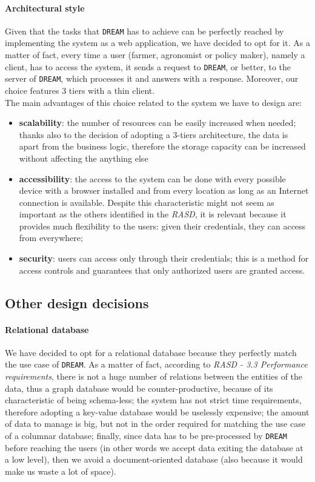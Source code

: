\documentclass{article}
\begin{document}
\paragraph{Architectural style}\label{Architectural style}
Given that the tasks that \verb|DREAM| has to achieve can be perfectly reached by implementing the system as a web application, we have decided to opt for it. As a matter of fact, every time a user (farmer, agronomist or policy maker), namely a client, has to access the system, it sends a request to \verb|DREAM|, or better, to the server of \verb|DREAM|, which processes it and answers with a response. Moreover, our choice features 3 tiers with a thin client.\\
The main advantages of this choice related to the system we have to design are:
\begin{itemize}
    \item \textbf{scalability}: the number of resources can be easily increased when needed; thanks also to the decision of adopting a 3-tiers architecture, the data is apart from the business logic, therefore the storage capacity can be increased without affecting the anything else
    \item \textbf{accessibility}: the access to the system can be done with every possible device with a browser installed and from every location as long as an Internet connection is available. Despite this characteristic might not seem as important as the others identified in the \textit{RASD}, it is relevant because it provides much flexibility to the users: given their credentials, they can access from everywhere;
    \item \textbf{security}: users can access only through their credentials; this is a method for access controls and guarantees that only authorized users are granted access.
\end{itemize}
\subsection{Other design decisions}
\paragraph{Relational database}
\justifying
We have decided to opt for a relational database because they perfectly match the use case of \verb|DREAM|. As a matter of fact, according to \textit{RASD - 3.3 Performance requirements}, there is not a huge number of relations between the entities of the data, thus a graph database would be counter-productive, because of its characteristic of being schema-less; the system has not strict time requirements, therefore adopting a key-value database would be uselessly expensive; the amount of data to manage is big, but not in the order required for matching the use case of a columnar database; finally, since data has to be pre-processed by \verb|DREAM| before reaching the users (in other words we accept data exiting the database at a low level), then we avoid a document-oriented database (also because it would make us waste a lot of space).
\end{document}
